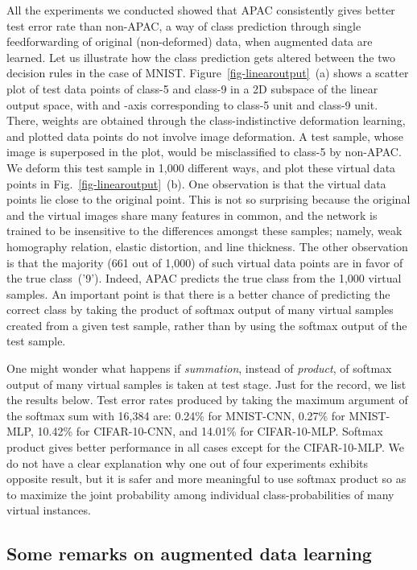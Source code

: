 \documentclass[10pt,twocolumn,letterpaper]{article}
\begin{document}
All the experiments we conducted showed that APAC consistently gives better test error rate than non-APAC, 
a way of class prediction through single feedforwarding of original (non-deformed) data, 
when augmented data are learned.
Let us illustrate how the class prediction gets altered between the two decision rules in the case of MNIST.
Figure~\ref{fig-linearoutput}~(a) 
shows a scatter plot of test data points of class-5 and class-9 in a 2D subspace of the linear output space,
with  and -axis corresponding to class-5 unit and class-9 unit.
There, weights are obtained through the class-indistinctive deformation learning, and
plotted data points do not involve image deformation.
A test sample, whose image is superposed in the plot, would be misclassified to class-5 by non-APAC.
We deform this test sample in 1,000 different ways, and plot these virtual data points
in Fig.~\ref{fig-linearoutput}~(b).
One observation is that the virtual data points lie close to the original point.
This is not so surprising because the original and the virtual images share many features in common, and
the network is trained to be insensitive to the differences amongst these samples; namely,
weak homography relation, elastic distortion, and line thickness.
The other observation is that the majority (661 out of 1,000) 
of such virtual data points are in favor of the true class~('9').
Indeed, APAC predicts the true class from the 1,000 virtual samples.
An important point is that there is a better chance of predicting the correct class 
by taking the product of softmax output of many virtual samples created from a given test sample,
rather than by using the softmax output of the test sample.

One might wonder what happens if {\it summation}, instead of {\it product}, of softmax output of many virtual samples
is taken at test stage.
Just for the record, we list the results below. 
Test error rates produced by taking the maximum argument of the softmax sum with 16,384 are: 
0.24\% for MNIST-CNN, 0.27\% for MNIST-MLP, 10.42\% for CIFAR-10-CNN, and 14.01\% for CIFAR-10-MLP.
Softmax product gives better performance in all cases except for the CIFAR-10-MLP.
We do not have a clear explanation why one out of four experiments exhibits opposite result,
but it is safer and more meaningful 
to use softmax product so as to maximize the joint probability
among individual class-probabilities of many virtual instances.

\subsection{Some remarks on augmented data learning}
\end{document}
